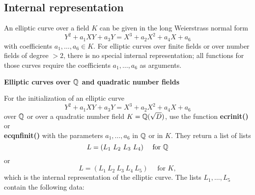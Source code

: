 \subsection{Internal representation}
An elliptic curve over a field $K$ can be given in the long Weierstrass normal
form
$$
        Y^2 + a_1 X Y + a_3 Y = X^3 + a_2 X^2 + a_4 X + a_6
$$
with coefficients $a_1,\ldots,a_6\in K$. For elliptic curves over finite
fields or over number fields of degree $>2$, there is no special internal
representation; all functions for those curves require the coefficients 
$a_1,\ldots,a_6$ as arguments.

{\bf Elliptic curves over $\mbox{$\mathbb Q$}$ and quadratic number fields} 

For the initialization of an elliptic curve 
$$
        Y^2 + a_1 X Y + a_3 Y = X^3 + a_2 X^2 + a_4 X + a_6
$$
over $\mbox{$\mathbb Q$}$ or over a quadratic number field $K=\mbox{$\mathbb Q$}(\sqrt{D})$, use the function 
{\bf ecrinit()} or \\
{\bf ecqnfinit()} with the parameters $a_1,\ldots, a_6$ in $\mbox{$\mathbb Q$}$ 
or in $K$. They return a list of lists
$$
             L = (L_1\  L_2\  L_3\  L_4) \quad \mbox{ for } \mbox{$\mathbb Q$}
$$
or
$$
             L = (L_1\  L_2\  L_3\  L_4\  L_5) \quad \mbox{ for } K,
$$ 
which is the internal representation of the elliptic curve. The lists
$L_1, \ldots, L_5$ contain the following data:

\newpage

